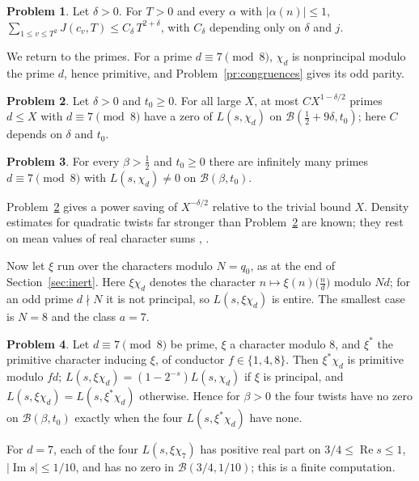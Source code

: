 \documentclass[reqno]{amsart}
\theoremstyle{definition}
\newtheorem{problem}{Problem}[section]
\theoremstyle{plain}
\theoremstyle{remark}
\renewcommand{\Re}{\operatorname{Re}}
\renewcommand{\Im}{\operatorname{Im}}
\newcommand{\leg}[2]{\bigl(\tfrac{#1}{#2}\bigr)}
\newcommand{\Bx}{\mathcal{B}}
\begin{document}
\begin{problem}\label{pr:sum-J}
Let $\delta > 0$.  For $T > 0$ and every $\alpha$ with $\lvert \alpha(n) \rvert \le 1$, $\sum_{1 \le v \le T^2} J(c_v, T) \le C_\delta\, T^{2 + \delta}$, with $C_\delta$ depending only on $\delta$ and $j$.
\end{problem}

We return to the primes.  For a prime $d \equiv 7 \pmod 8$, $\chi_d$ is nonprincipal modulo the prime $d$, hence primitive, and Problem~\ref{pr:congruences} gives its odd parity.

\begin{problem}\label{pr:count-d}
Let $\delta > 0$ and $t_0 \ge 0$.  For all large $X$, at most $C X^{1 - \delta/2}$ primes $d \le X$ with $d \equiv 7 \pmod 8$ have a zero of $L(s, \chi_d)$ on $\Bx(\frac12 + 9\delta, t_0)$; here $C$ depends on $\delta$ and $t_0$.
\end{problem}

\begin{problem}\label{pr:some-good}
For every $\beta > \frac12$ and $t_0 \ge 0$ there are infinitely many primes $d \equiv 7 \pmod 8$ with $L(s, \chi_d) \ne 0$ on $\Bx(\beta, t_0)$.
\end{problem}

Problem~\ref{pr:count-d} gives a power saving of $X^{-\delta/2}$ relative to the trivial bound $X$.  Density estimates for quadratic twists far stronger than Problem~\ref{pr:count-d} are known; they rest on mean values of real character sums \cite{Ju}, \cite{HB}.

Now let $\xi$ run over the characters modulo $N = q_0$, as at the end of Section~\ref{sec:inert}.  Here $\xi\chi_d$ denotes the character $n \mapsto \xi(n)\leg{n}{d}$ modulo $Nd$; for an odd prime $d \nmid N$ it is not principal, so $L(s, \xi\chi_d)$ is entire.  The smallest case is $N = 8$ and the class $a = 7$.

\begin{problem}\label{pr:level-8}
Let $d \equiv 7 \pmod 8$ be prime, $\xi$ a character modulo $8$, and $\xi^*$ the primitive character inducing $\xi$, of conductor $f \in \{1, 4, 8\}$.  Then $\xi^*\chi_d$ is primitive modulo $fd$; $L(s, \xi\chi_d) = (1 - 2^{-s}) L(s, \chi_d)$ if $\xi$ is principal, and $L(s, \xi\chi_d) = L(s, \xi^*\chi_d)$ otherwise.  Hence for $\beta > 0$ the four twists have no zero on $\Bx(\beta, t_0)$ exactly when the four $L(s, \xi^*\chi_d)$ have none.
\end{problem}

For $d = 7$, each of the four $L(s, \xi\chi_7)$ has positive real part on $3/4 \le \Re s \le 1$, $\lvert \Im s \rvert \le 1/10$, and has no zero in $\Bx(3/4, 1/10)$; this is a finite computation.
\end{document}
